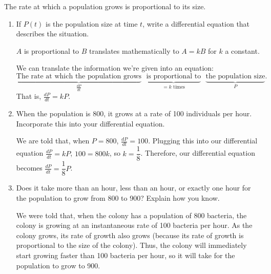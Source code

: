 \documentclass{article}
\begin{document}
\begin{enumerate}
 The rate at which a population grows is proportional to its size. 
  \begin{enumerate}
  \item
    \begin{problem}
      If $P(t)$ is the population size at time $t$, write a differential
      equation that describes the situation.      
    \end{problem}
\pspace{\vfill}
  \begin{framed}
     {$A$ is proportional to $B$} translates mathematically to $A = kB$ for $k$ a constant.
  \end{framed}
    \begin{solution}
      We can translate the information we're given into an equation: 
      \[ \underbrace{\text{The rate at which the population
          grows}}_{\frac{dP}{dt}} \text{ } \underbrace{\text{is
          proportional to}}_{{} = k \text{ times}} \text{ }
      \underbrace{\text{the population size}}_{P}.\] That is,
      $\boxed{\frac{dP}{dt} = k P}$. 
    \end{solution}

  \item
    \begin{problem}
      When the population is 800, it grows at a rate of 100 individuals per hour. Incorporate this into
      your differential equation.
    \end{problem}

    \begin{solution}
      We are told that, when $P = 800$, $\frac{dP}{dt} = 100$.  Plugging
      this into our differential equation $\frac{dP}{dt} = kP$, $100 = 800
      k$, so $k = \dfrac{1}{8}$.  Therefore, our differential equation becomes
      $\boxed{\frac{dP}{dt} = \dfrac{1}{8} P}$.
    \end{solution}
    \pspace{\vfill}
\item
    \begin{problem}
      Does it take more than an hour, less than an hour, or exactly one
      hour for the population to grow from 800 to 900?  Explain
      how you know.
    \end{problem}

    \begin{solution}
      We were told that, when the colony has a population of 800 bacteria,
      the colony is growing at an instantaneous rate of 100 bacteria per
      hour.  As the colony grows, its rate of growth also grows (because
      its rate of growth is proportional to the size of the colony).
      Thus, the colony will immediately start growing faster than 100
      bacteria per hour, so it will take  for the
      population to grow to 900.
    \end{solution}
 

\end{enumerate}
\end{enumerate}
\end{document}
